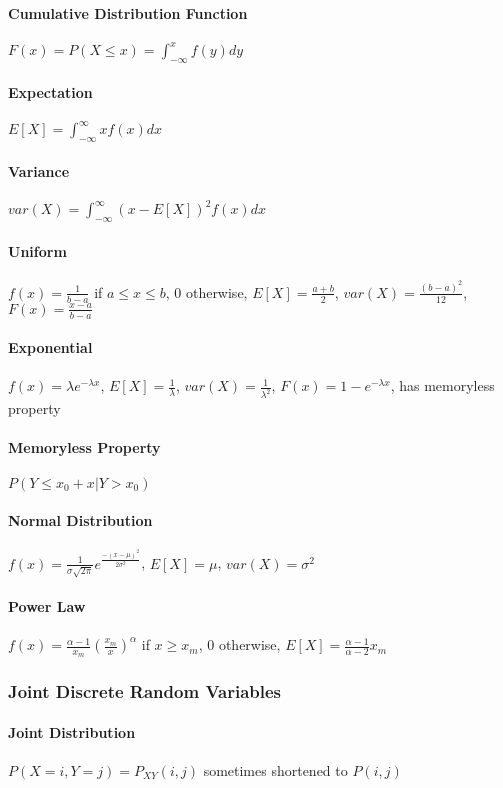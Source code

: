 \paragraph{Cumulative Distribution Function} 
$F(x) = P(X\le x) = \int_{-\infty}^{x} f(y) dy$
\paragraph{Expectation}
$E[X] = \int_{-\infty}^{\infty} x f(x) dx$
\paragraph{Variance}
$var(X) = \int_{-\infty}^{\infty} (x-E[X])^2 f(x) dx$

\paragraph{Uniform}
$f(x) = \frac{1}{b-a}$ if $a \le x \le b$, 0 otherwise, 
$E[X] = \frac{a+b}{2}$, 
$var(X) = \frac{(b-a)^2}{12}$, 
$F(x) = \frac{x-a}{b-a}$
\paragraph{Exponential}
$f(x) = \lambda e^{-\lambda x}$, 
$E[X] = \frac{1}{\lambda}$, 
$var(X) = \frac{1}{\lambda^2}$, 
$F(x) = 1 - e^{-\lambda x}$,
has memoryless property
\paragraph{Memoryless Property}
$P(Y \le x_0 + x | Y > x_0)$
\paragraph{Normal Distribution}
$f(x) = \frac{1}{\sigma \sqrt{2\pi}} e^{\frac{-(x-\mu)^2}{2\sigma^2}}$, 
$E[X] = \mu$, 
$var(X) = \sigma^2$
\paragraph{Power Law}
$f(x) = \frac{\alpha - 1}{x_m} \left( \frac{x_m}{x} \right)^\alpha$ if $x \ge
x_m$, 0 otherwise, 
$E[X] = \frac{\alpha-1}{\alpha-2} x_m$
\subsubsection{Joint Discrete Random Variables}
\paragraph{Joint Distribution} $P(X=i, Y=j) = P_{XY}(i,j)$ sometimes shortened to $ P(i,j)$
